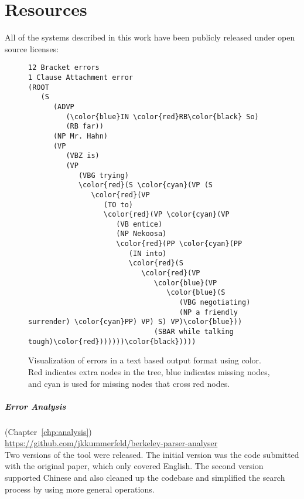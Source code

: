 \chapter{Resources} \label{chp:resources}

All of the systems described in this work have been publicly released under open source licenses:

\begin{figure}
{\footnotesize
  \begin{Verbatim}[commandchars=\\\{\},codes={\catcode`$=3\catcode`^=7\catcode`_=8}]
12 Bracket errors
1 Clause Attachment error
(ROOT
   (S
      (ADVP
         (\color{blue}IN \color{red}RB\color{black} So)
         (RB far))
      (NP Mr. Hahn)
      (VP
         (VBZ is)
         (VP
            (VBG trying)
            \color{red}(S \color{cyan}(VP (S
               \color{red}(VP
                  (TO to)
                  \color{red}(VP \color{cyan}(VP
                     (VB entice)
                     (NP Nekoosa)
                     \color{red}(PP \color{cyan}(PP
                        (IN into)
                        \color{red}(S
                           \color{red}(VP
                              \color{blue}(VP
                                 \color{blue}(S
                                    (VBG negotiating)
                                    (NP a friendly surrender) \color{cyan}PP) VP) S) VP)\color{blue}))
                              (SBAR while talking tough)\color{red}))))))\color{black}))))
\end{Verbatim}
}
\caption[Parse error visualization example.]{ \label{fig:error-vis}
  Visualization of errors in a text based output format using color.
  Red indicates extra nodes in the tree, blue indicates missing nodes, and cyan is used for missing nodes that cross red nodes.
}
\end{figure}

\paragraph{Error Analysis} (Chapter~\ref{chp:analysis}) \\
\url{https://github.com/jkkummerfeld/berkeley-parser-analyser} \\
Two versions of the tool were released.
The initial version was the code submitted with the original paper, which only covered English.
The second version supported Chinese and also cleaned up the codebase and simplified the search process by using more general operations.

